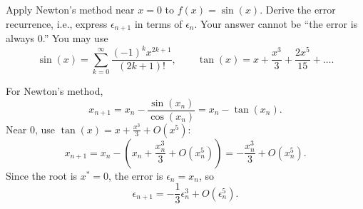 \documentclass[reqno, answers]{exam}
\begin{document}
\begin{questions}
  \question[5] Apply Newton's method near $x=0$ to $f(x)=\sin(x)$. Derive the error recurrence, i.e., express $\epsilon_{n+1}$ in terms of $\epsilon_n$. Your answer cannot be ``the error is always 0.'' You may use
  \[
    \sin(x)=\sum_{k=0}^{\infty}\frac{(-1)^k x^{2k+1}}{(2k+1)!},
    \qquad
    \tan(x)=x+\frac{x^3}{3}+\frac{2x^5}{15}+ \dots.
  \]

  \begin{solution}
    For Newton's method,
    \[
      x_{n+1}=x_n-\frac{\sin(x_n)}{\cos(x_n)}=x_n-\tan(x_n).
    \]
    Near $0$, use $\tan(x)=x+\frac{x^3}{3}+O(x^5)$:
    \[
      x_{n+1}=x_n-\left(x_n+\frac{x_n^3}{3}+O(x_n^5)\right)
      =-\frac{x_n^3}{3}+O(x_n^5).
    \]
    Since the root is $x^*=0$, the error is $\epsilon_n=x_n$, so
    \[
      \epsilon_{n+1}=-\frac{1}{3}\epsilon_n^3+O(\epsilon_n^5).
    \]
  \end{solution}
  \vfill

\end{questions}
\end{document}
